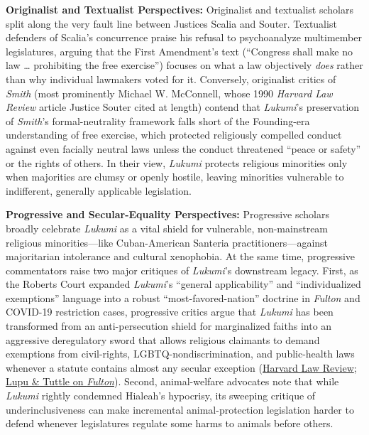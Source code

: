 \documentclass[12pt]{article}
\begin{document}
\textbf{Originalist and Textualist Perspectives:} Originalist and textualist scholars split along the very fault line between Justices Scalia and Souter. Textualist defenders of Scalia's concurrence praise his refusal to psychoanalyze multimember legislatures, arguing that the First Amendment's text (``Congress shall make no law \dots{} prohibiting the free exercise'') focuses on what a law objectively \textit{does} rather than why individual lawmakers voted for it. Conversely, originalist critics of \textit{Smith} (most prominently Michael W. McConnell, whose 1990 \textit{Harvard Law Review} article Justice Souter cited at length) contend that \textit{Lukumi}'s preservation of \textit{Smith}'s formal-neutrality framework falls short of the Founding-era understanding of free exercise, which protected religiously compelled conduct against even facially neutral laws unless the conduct threatened ``peace or safety'' or the rights of others. In their view, \textit{Lukumi} protects religious minorities only when majorities are clumsy or openly hostile, leaving minorities vulnerable to indifferent, generally applicable legislation.

\textbf{Progressive and Secular-Equality Perspectives:} Progressive scholars broadly celebrate \textit{Lukumi} as a vital shield for vulnerable, non-mainstream religious minorities---like Cuban-American Santeria practitioners---against majoritarian intolerance and cultural xenophobia. At the same time, progressive commentators raise two major critiques of \textit{Lukumi}'s downstream legacy. First, as the Roberts Court expanded \textit{Lukumi}'s ``general applicability'' and ``individualized exemptions'' language into a robust ``most-favored-nation'' doctrine in \textit{Fulton} and COVID-19 restriction cases, progressive critics argue that \textit{Lukumi} has been transformed from an anti-persecution shield for marginalized faiths into an aggressive deregulatory sword that allows religious claimants to demand exemptions from civil-rights, LGBTQ-nondiscrimination, and public-health laws whenever a statute contains almost any secular exception (\href{https://harvardlawreview.org/print/vol-137/rights-of-first-refusal/}{Harvard Law Review}; \href{https://scholarship.law.gwu.edu/cgi/viewcontent.cgi?filename=0&article=2806&context=faculty_publications&type=additional}{Lupu \& Tuttle on \textit{Fulton}}). Second, animal-welfare advocates note that while \textit{Lukumi} rightly condemned Hialeah's hypocrisy, its sweeping critique of underinclusiveness can make incremental animal-protection legislation harder to defend whenever legislatures regulate some harms to animals before others.
\end{document}
